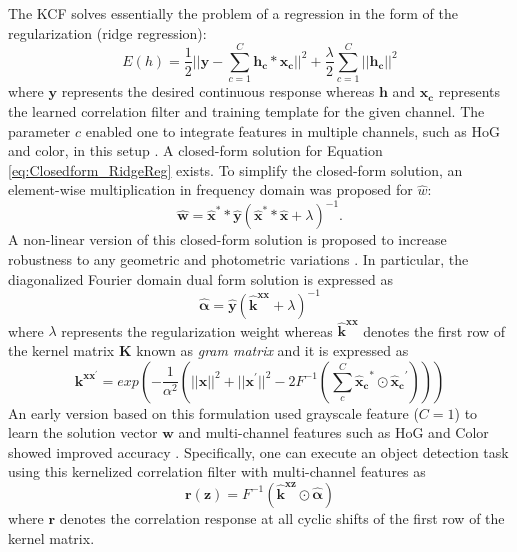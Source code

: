 \documentclass[10pt,twocolumn,letterpaper]{article}
\begin{document}
The KCF solves essentially the problem of a regression in the form of
the regularization (ridge regression):
\begin{equation}
E(h) = \frac{1}{2}||\mathbf{y}-\sum_{c=1}^{C}\mathbf{h_{c}}*\mathbf{x_{c}}||^{2} + \frac{\lambda}{2}\sum_{c=1}^{C}||\mathbf{h_{c}}||^{2}
\label{eq:Closedform_RidgeReg}
\end{equation}
where $\mathbf{y}$ represents the desired continuous response whereas $\mathbf{h}$ and
$\mathbf{x_{c}}$ represents the learned correlation filter and training
template for the given channel. The parameter $c$ enabled one to
integrate features in multiple channels, such as HoG and color, in
this setup \cite{henriques2015high,galoogahi2013multi}. A closed-form
solution for Equation \ref{eq:Closedform_RidgeReg} exists. To simplify the
closed-form solution, an element-wise multiplication in
frequency domain was proposed for $\hat{w}$:
\begin{equation}
\mathbf{\hat{w}} = \mathbf{\hat{x}^{*}}*\mathbf{\hat{y}}(\mathbf{\hat{x}^{*}}*\mathbf{\hat{x}}+\lambda)^{-1}.
\label{eq:DiagonalizedPrimalSolution}
\end{equation}
A non-linear version of this closed-form solution is proposed to increase robustness
to any geometric and photometric variations
\cite{henriques2015high}. In particular, the diagonalized Fourier
domain dual form solution is expressed as
\begin{equation}
\mathbf{\hat{\alpha}} = \mathbf{\hat{y}}(\mathbf{\hat{k}^{xx}}+\lambda)^{-1}
\label{eq:FourierDualDomainSolution}
\end{equation}
where $\lambda$ represents the regularization weight whereas $\mathbf{\hat{k}^{xx}}$ denotes
 the first row of the kernel matrix $\mathbf{K}$ known as \textit{gram matrix} and it is expressed as
\begin{equation}
\mathbf{k^{xx^{'}}} = exp(-\dfrac{1}{\alpha^{2}}(||\mathbf{x}||^{2}+||\mathbf{x}^{'}||^{2}-2F^{-1}(\sum^{C}_{c}\mathbf{\hat{x}_{c}}^{*}\odot \mathbf{\hat{x}_{c}}^{'})))
\label{eq:GaussianCorrelationSingleChannel}
\end{equation}
An early version based on this formulation used grayscale feature
($C=1$) to learn the solution vector $\mathbf{w}$ and multi-channel features
such as HoG and Color showed improved accuracy
\cite{henriques2015high,galoogahi2013multi,tang2015multi,ma2015long,bibi2015multi}. 
Specifically, one can execute an object detection task using this kernelized correlation
filter with multi-channel features as
\begin{equation}
\mathbf{r(z)} = F^{-1}(\mathbf{\hat{k}^{xz}} \odot \mathbf{\hat{\alpha}})
\end{equation}
where $\mathbf{r}$ denotes the correlation response at all cyclic shifts of the
first row of the kernel matrix.
\end{document}
